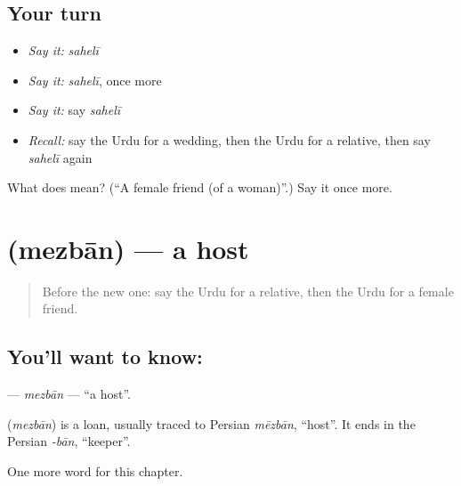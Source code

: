 \subsection*{Your turn}
\begin{itemize}
\raggedright
  \item \emph{Say it:} \emph{sahelī}
  \item \emph{Say it:} \emph{sahelī}, once more
  \item \emph{Say it:} say \emph{sahelī}
  \item \emph{Recall:} say the Urdu for a wedding, then the Urdu for a relative, then say \emph{sahelī} again
\end{itemize}

\begin{tcolorbox}[breakable,colback=teal!4,colframe=teal!35!black,title={Before you move on}]
What does  mean? (\textquotedblleft{}A female friend (of a woman)\textquotedblright{}.) Say it once more.
\end{tcolorbox}
\section[\texorpdfstring{\ur{میزبان} (mezbān)}{میزبان (mezbān)}]{ (mezbān) — a host}

\label{lesson:UR-C256-mezban}



\begin{quote}
Before the new one: say the Urdu for a relative, then the Urdu for a female friend.
\end{quote}

\subsection*{You'll want to know: }
\textbf{} — \emph{mezbān} — \textquotedblleft{}a host\textquotedblright{}.

\begin{cousinweb}
\textbf{} (\emph{mezbān}) is a loan, usually traced to Persian \emph{mēzbān}, \textquotedblleft{}host\textquotedblright{}. It ends in the Persian \emph{-bān}, \textquotedblleft{}keeper\textquotedblright{}.
\end{cousinweb}

\begin{grammarlens}[title={What you've built}]
One more word for this chapter.
\end{grammarlens}

